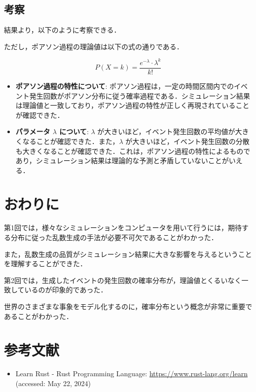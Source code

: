 \documentclass[fleqn, a4paper. 12pt]{jsarticle}
\begin{document}
  \subsection*{考察}

    結果より，以下のように考察できる．

    ただし，ポアソン過程の理論値は以下の式の通りである．

    \begin{equation}
      P(X = k) = \frac{e^{-\lambda} \cdot \lambda^k}{k!}
    \end{equation}

    \begin{itemize}
      \item \textbf{ポアソン過程の特性について}: ポアソン過程は，一定の時間区間内でのイベント発生回数がポアソン分布に従う確率過程である．シミュレーション結果は理論値と一致しており，ポアソン過程の特性が正しく再現されていることが確認できた．
      \item \textbf{パラメータ $\lambda$ について}: $\lambda$ が大きいほど，イベント発生回数の平均値が大きくなることが確認できた．また，$\lambda$ が大きいほど，イベント発生回数の分散も大きくなることが確認できた．これは，ポアソン過程の特性によるものであり，シミュレーション結果は理論的な予測と矛盾していないことがいえる．
    \end{itemize}
      
  \section*{おわりに}

    第1回では，様々なシミュレーションをコンピュータを用いて行うには，期待する分布に従った乱数生成の手法が必要不可欠であることがわかった．
    
    また，乱数生成の品質がシミュレーション結果に大きな影響を与えるということを理解することができた．

    \quad

    第2回では，生成したイベントの発生回数の確率分布が，理論値とくるいなく一致しているのが印象的であった．

    世界のさまざまな事象をモデル化するのに，確率分布という概念が非常に重要であることがわかった．

  \newpage
  
  \section*{参考文献}

    \begin{itemize}
        \item Learn Rust - Rust Programming Language: \url{https://www.rust-lang.org/learn} (accessed: May 22, 2024)
    \end{itemize}
\end{document}
